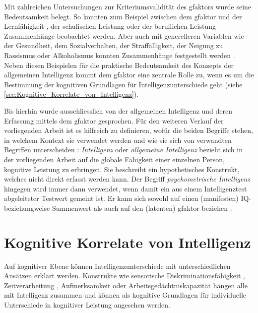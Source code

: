 \documentclass[11pt, twoside, a4paper]{book}		%
\begin{document}
Mit zahlreichen Untersuchungen zur Kriteriumsvalidität des \gls{gfaktor}s wurde seine Bedeutsamkeit belegt. So konnten zum Beispiel zwischen dem \gls{gfaktor} und der Lernfähigkeit \citep{Christal1991}, der schulischen Leistung \citep{Jensen1998a} oder der beruflichen Leistung \citep{Schmidt2004} Zusammenhänge beobachtet werden. Aber auch mit generelleren Variablen wie der Gesundheit, dem Sozialverhalten, der Straffälligkeit, der Neigung zu Rassismus oder Alkoholismus konnten Zusammenhänge festgestellt werden \citep[für eine Übersicht siehe][]{Brand1987}. 
Neben diesen Beispielen für die praktische Bedeutsamkeit des Konzepts der allgemeinen Intelligenz kommt dem \gls{gfaktor} eine zentrale Rolle zu, wenn es um die Bestimmung der kognitiven Grundlagen für Intelligenzunterschiede geht (siehe \autoref{sec:Kognitive_Korrelate_von_Intelligenz}).

Bis hierhin wurde ausschliesslich von der allgemeinen Intelligenz und deren Erfassung mittels dem \gls{gfaktor} gesprochen. Für den weiteren Verlauf der vorliegenden Arbeit ist es hilfreich zu definieren, wofür die beiden Begriffe stehen, in welchem Kontext sie verwendet werden und wie sie sich von verwandten Begriffen unterscheiden \citep[für eine ähnliche Begriffsverwendung siehe][]{Rabaglia2011}:
\textit{Intelligenz} oder \textit{allgemeine Intelligenz} bezieht sich in der vorliegenden Arbeit auf die globale Fähigkeit einer einzelnen Person, kognitive Leistung zu erbringen. Sie beschreibt ein hypothetisches Konstrukt, welches nicht direkt erfasst werden kann.
Der Begriff \textit{psychometrische Intelligenz} hingegen wird immer dann verwendet, wenn damit ein aus einem Intelligenztest abgeleiteter Testwert gemeint ist. Er kann sich sowohl auf einen (manifesten) IQ- beziehungweise Summenwert als auch auf den (latenten) \gls{gfaktor} beziehen \citep[die beiden Werte sind stark korreliert, siehe][S. 90]{Jensen1998a}.





\section{Kognitive Korrelate von Intelligenz \label{sec:Kognitive_Korrelate_von_Intelligenz}}

Auf kognitiver Ebene können Intelligenzunterschiede mit unterschiedlichen Ansätzen erklärt werden. Konstrukte wie sensorische Diskriminationsfähigkeit \citep[z. B.][]{Galton1883, Spearman1904, Deary2004, Meyer2010}, Zeitverarbeitung \citep[z. B.][]{Rammsayer2002}, Aufmerksamkeit \citep[z. B.][]{Schweizer2004} oder Arbeitsgedächtniskapazität \citep[für eine Metaanalyse siehe][]{Ackerman2005} hängen alle mit Intelligenz zusammen und können als kognitive Grundlagen für individuelle Unterschiede in kognitiver Leistung angesehen werden. 
\end{document}
